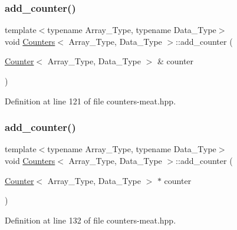 \subsubsection{\texorpdfstring{add\+\_\+counter()}{add\_counter()}\hspace{0.1cm}{\footnotesize\ttfamily [1/3]}}
{\footnotesize\ttfamily template$<$typename Array\+\_\+\+Type, typename Data\+\_\+\+Type$>$ \\
void \hyperlink{class_counters}{Counters}$<$ Array\+\_\+\+Type, Data\+\_\+\+Type $>$\+::add\+\_\+counter (\begin{DoxyParamCaption}\item[{\hyperlink{class_counter}{Counter}$<$ Array\+\_\+\+Type, Data\+\_\+\+Type $>$ \&}]{counter }\end{DoxyParamCaption})\hspace{0.3cm}{\ttfamily [inline]}}



Definition at line 121 of file counters-\/meat.\+hpp.

\mbox{\label{class_counters_a74f054aa9ea64103c2d9f79f115777d4}} 
\subsubsection{\texorpdfstring{add\+\_\+counter()}{add\_counter()}\hspace{0.1cm}{\footnotesize\ttfamily [2/3]}}
{\footnotesize\ttfamily template$<$typename Array\+\_\+\+Type, typename Data\+\_\+\+Type$>$ \\
void \hyperlink{class_counters}{Counters}$<$ Array\+\_\+\+Type, Data\+\_\+\+Type $>$\+::add\+\_\+counter (\begin{DoxyParamCaption}\item[{\hyperlink{class_counter}{Counter}$<$ Array\+\_\+\+Type, Data\+\_\+\+Type $>$ $\ast$}]{counter }\end{DoxyParamCaption})\hspace{0.3cm}{\ttfamily [inline]}}



Definition at line 132 of file counters-\/meat.\+hpp.

\mbox{\label{class_counters_a4ee47504f9c76892c6028619e6b138ee}} 
